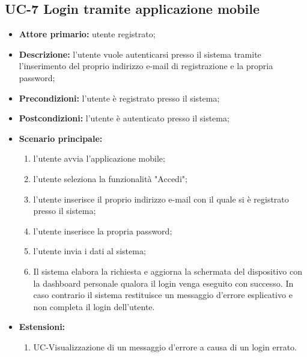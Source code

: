 \subsection{UC-7 Login tramite applicazione mobile}
\begin{itemize}
	\item \textbf{Attore primario:} utente registrato;

	\item \textbf{Descrizione:} l'utente vuole autenticarsi presso il sistema tramite l'inserimento del proprio indirizzo e-mail di registrazione e la propria password;

	\item \textbf{Precondizioni:} l'utente è registrato presso il sistema;

	\item \textbf{Postcondizioni:} l'utente è autenticato presso il sistema;

	\item\textbf{Scenario principale:} 

	\begin{enumerate}
   		 \item l'utente avvia l'applicazione mobile;
    	 \item l'utente seleziona la funzionalità "Accedi";
 	     \item l'utente inserisce il proprio indirizzo e-mail con il quale si è registrato presso il sistema;
   	 	 \item l'utente inserisce la propria password; 
   		 \item l'utente invia i dati al sistema;
    	 \item Il sistema elabora la richiesta e aggiorna la schermata del dispositivo con la dashboard personale qualora il login venga eseguito con successo. In caso contrario il sistema restituisce un messaggio d'errore esplicativo e non completa il login dell'utente.
	\end{enumerate}
	\item \textbf{Estensioni:}
	\begin{enumerate}
    	\item UC-Visualizzazione di un messaggio d'errore a causa di un login errato.
	\end{enumerate}
\end{itemize}
